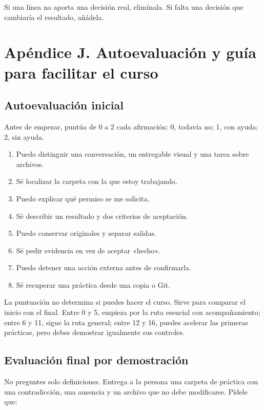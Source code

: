 \documentclass[10pt,a4paper,openany]{book}
\providecommand{\tightlist}{\setlength{\itemsep}{0.18em}\setlength{\parskip}{0pt}}
\begin{document}
Si una línea no aporta una decisión real, elimínala. Si falta una
decisión que cambiaría el resultado, añádela.

\chapter{Apéndice J. Autoevaluación y guía para facilitar el
curso}\label{apuxe9ndice-j.-autoevaluaciuxf3n-y-guuxeda-para-facilitar-el-curso}

\section{Autoevaluación inicial}\label{autoevaluaciuxf3n-inicial}

Antes de empezar, puntúa de 0 a 2 cada afirmación: 0, todavía no; 1, con
ayuda; 2, sin ayuda.

\begin{enumerate}
\def\labelenumi{\arabic{enumi}.}
\tightlist
\item
  Puedo distinguir una conversación, un entregable visual y una tarea
  sobre archivos.
\item
  Sé localizar la carpeta con la que estoy trabajando.
\item
  Puedo explicar qué permiso se me solicita.
\item
  Sé describir un resultado y dos criterios de aceptación.
\item
  Puedo conservar originales y separar salidas.
\item
  Sé pedir evidencia en vez de aceptar «hecho».
\item
  Puedo detener una acción externa antes de confirmarla.
\item
  Sé recuperar una práctica desde una copia o Git.
\end{enumerate}

La puntuación no determina si puedes hacer el curso. Sirve para comparar
el inicio con el final. Entre 0 y 5, empieza por la ruta esencial con
acompañamiento; entre 6 y 11, sigue la ruta general; entre 12 y 16,
puedes acelerar las primeras prácticas, pero debes demostrar igualmente
sus controles.

\section{Evaluación final por
demostración}\label{evaluaciuxf3n-final-por-demostraciuxf3n}

No preguntes solo definiciones. Entrega a la persona una carpeta de
práctica con una contradicción, una ausencia y un archivo que no debe
modificarse. Pídele que:
\end{document}
